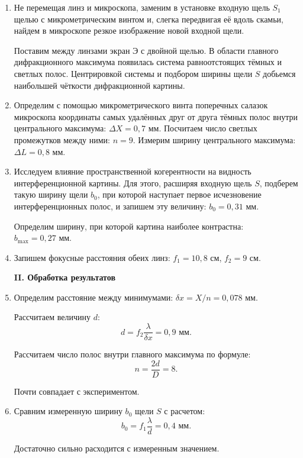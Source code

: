 \documentclass[a4paper,12pt]{article} %
\begin{document}
	\begin{enumerate}
		\item Не перемещая линз и микроскопа, заменим в установке входную щель $S_1$ щелью с микрометрическим винтом и, слегка передвигая её вдоль скамьи, найдем в микроскопе резкое изображение новой входной щели.
		
		Поставим между линзами экран Э с двойной щелью. В области главного дифракционного максимума появилась система равноотстоящих тёмных и светлых полос. Центрировкой системы и подбором ширины щели $S$ добьемся наибольшей чёткости дифракционной картины.
		
		\item Определим с помощью микрометрического винта поперечных салазок микроскопа координаты самых удалённых друг от друга тёмных полос внутри центрального максимума: $\Delta X = 0,7$ мм.
		Посчитаем число светлых промежутков между ними: $n = 9$. Измерим ширину центрального максимума: $\Delta L = 0,8$ мм.
		
		\item Исследуем влияние пространственной когерентности на видность интерференционной картины. Для этого, расширяя входную щель $S$, подберем такую ширину щели $b_0$, при которой наступает первое исчезновение интерференционных полос, и запишем эту величину: $b_0 = 0,31$ мм.
		
		Определим ширину, при которой картина наиболее контрастна: \\ $b_\text{max} = 0,27$ мм.
		
		\item Запишем фокусные расстояния обеих линз: $f_1 = 10,8$ см, $f_2 = 9$ см.
		
		
		
		\begin{center}
			\textbf{II. Обработка результатов}
		\end{center}
	
		\item Определим расстояние между минимумами: $\delta x = X / n = 0,078$ мм.
		
		Рассчитаем величину $d$:
		\begin{equation*}
			d = f_2 \frac{\lambda}{\delta x} = 0,9 \text{ мм.}
		\end{equation*}
		
		Рассчитаем число полос внутри главного максимума по формуле:
		\begin{equation*}
			n = \frac{2d}{D} = 8.
		\end{equation*}
	
		Почти совпадает с экспериментом.
		
		\item Сравним измеренную ширину $b_0$ щели $S$ с расчетом:
		\begin{equation*}
			b_0 = f_1 \frac{\lambda}{d} = 0,4 \text{ мм.}
		\end{equation*}
		
		Достаточно сильно расходится с измеренным значением.
	\end{enumerate}
\end{document}
